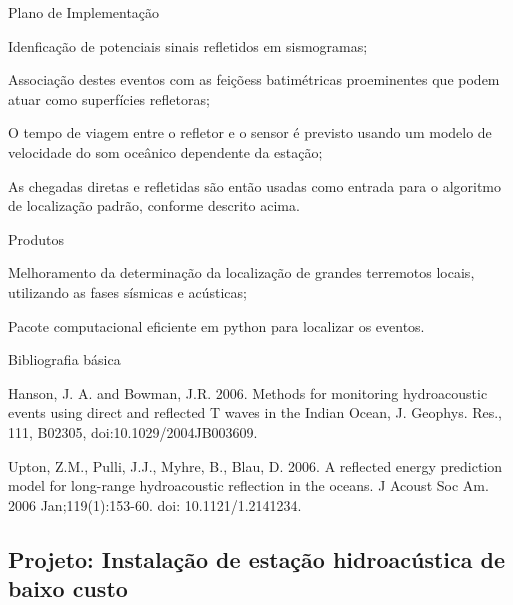 \documentclass[10pt,a4paper,oneside]{book}
\begin{document}
\begin{fancyenum}{\faBrain}{Plano de Implementação}
	\item Idenficação de potenciais sinais refletidos em sismogramas;
	\item Associação destes eventos com as feiçõess batimétricas proeminentes que podem atuar como superfícies refletoras;
	\item O tempo de viagem entre o refletor e o sensor é previsto usando um modelo de velocidade do som oceânico dependente da estação;
	\item As chegadas diretas e refletidas são então usadas como entrada para o algoritmo de localização padrão, conforme descrito acima.
\end{fancyenum}

\begin{fancyenum}{\faShoppingCart}{Produtos}
	\item Melhoramento da determinação da localização de grandes terremotos locais, utilizando as fases sísmicas e acústicas;
	\item Pacote computacional eficiente em python para localizar os eventos.
\end{fancyenum}

\begin{fancyenum}{\faBook}{Bibliografia básica}
	\item Hanson, J. A. and Bowman, J.R.  2006. Methods for monitoring hydroacoustic events using direct and reflected T waves in the Indian Ocean, J. Geophys. Res., 111, B02305, doi:10.1029/2004JB003609.
	\item Upton, Z.M., Pulli, J.J., Myhre, B., Blau, D. 2006. A reflected energy prediction model for long-range hydroacoustic reflection in the oceans. J Acoust Soc Am. 2006 Jan;119(1):153-60. doi: 10.1121/1.2141234.
\end{fancyenum}

\subsection{Projeto: Instalação de estação hidroacústica de baixo custo}
\end{document}
